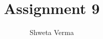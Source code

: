 \documentclass[journal,12pt,twocolumn]{IEEEtran}
\begin{document}
\makeatletter
{}
\makeatother
\let\StandardTheFigure\thefigure
\let\vec\mathbf
\renewcommand{\thefigure}{\theproblem}
\def\putbox#1#2#3{\makebox[0in][l]{\makebox[#1][l]{}\raisebox{\baselineskip}[0in][0in]{\raisebox{#2}[0in][0in]{#3}}}}
     \def\rightbox#1{\makebox[0in][r]{#1}}
     \def\centbox#1{\makebox[0in]{#1}}
     \def\topbox#1{\raisebox{-\baselineskip}[0in][0in]{#1}}
     \def\midbox#1{\raisebox{-0.5\baselineskip}[0in][0in]{#1}}
\vspace{3cm}
\title{Assignment 9}
\author{Shweta Verma}
%
%
%
% 
%
\end{document}
